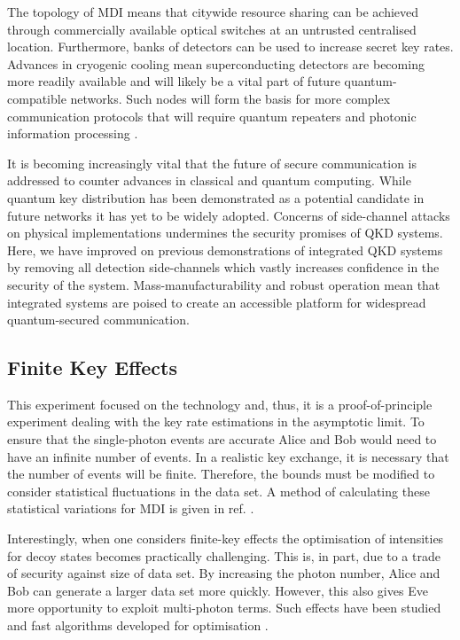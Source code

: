 The topology of \ac{MDI} means that citywide resource sharing can be achieved through commercially available optical switches at an untrusted centralised location. Furthermore, banks of detectors can be used to increase secret key rates. Advances in cryogenic cooling mean superconducting detectors are becoming more readily available and will likely be a vital part of future quantum-compatible networks. Such nodes will form the basis for more complex communication protocols that will require quantum repeaters and photonic information processing \cite{wehner2018}. 

It is becoming increasingly vital that the future of secure communication is addressed to counter advances in classical and quantum computing. While quantum key distribution has been demonstrated as a potential candidate in future networks it has yet to be widely adopted. Concerns of side-channel attacks on physical implementations undermines the security promises of \ac{QKD} systems. Here, we have improved on previous demonstrations of integrated \ac{QKD} systems by removing all detection side-channels which vastly increases confidence in the security of the system. Mass-manufacturability and robust operation mean that integrated systems are poised to create an accessible platform for widespread quantum-secured communication.

\subsection{Finite Key Effects}

This experiment focused on the technology and, thus, it is a proof-of-principle experiment dealing with the key rate estimations in the asymptotic limit. To ensure that the single-photon events are accurate Alice and Bob would need to have an infinite number of events. In a realistic key exchange, it is necessary that the number of events will be finite. Therefore, the bounds must be modified to consider statistical fluctuations in the data set. A method of calculating these statistical variations for \ac{MDI} is given in ref. \cite{zhou2016}.

Interestingly, when one considers finite-key effects the optimisation of intensities for decoy states becomes practically challenging. This is, in part, due to a trade of security against size of data set. By increasing the photon number, Alice and Bob can generate a larger data set more quickly. However, this also gives Eve more opportunity to exploit multi-photon terms. Such effects have been studied and fast algorithms developed for optimisation \cite{Wang2019asymmetric}.

